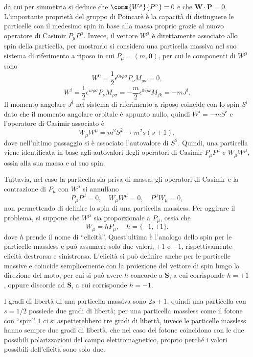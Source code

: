 da cui per simmetria si deduce che $\comm{W^\mu}{P^\nu} = 0$ e che $\bm{W}\cdot\bm{P} = 0$. L'importante proprietà del gruppo di Poincarè è la capacità di distinguere le particelle con il medesimo spin in base alla massa proprio grazie al nuovo operatore di Casimir $P_\mu P^\mu$. Invece, il vettore $W^\mu$ è direttamente associato allo spin della particella, per mostrarlo si considera una particella massiva nel suo sistema di riferimento a riposo in cui $P_\mu = (m,\bm{0})$, per cui le componenti di $W^\mu$ sono
\begin{equation}
    W^0 = \frac{1}{2}\epsilon^{0\nu\rho\sigma}P_\nu M_{\rho\sigma} = 0,
\end{equation}
\begin{equation}
    W^i = \frac{1}{2}\epsilon^{i\nu\rho\sigma}P_\nu M_{\rho\sigma} = -\frac{m}{2}\epsilon^{0ijk}M_{jk}=-mJ^i.
\end{equation}
Il momento angolare $J^i$ nel sistema di riferimento a riposo coincide con lo spin $S^i$ dato che il momento angolare orbitale è appunto nullo, quindi $W^i = -mS^i$ e l'operatore di Casimir associato è 
\begin{equation}
    W_\mu W^\mu = m^2S^2 \rightarrow m^2 s(s+1),
\end{equation}
dove nell'ultimo passaggio si è associato l'autovalore di $S^2$. Quindi, una particella viene identificata in base agli autovalori degli operatori di Casimir $P_\mu P^\mu$ e $W_\mu W^\mu$, ossia alla sua massa e al suo spin.

Tuttavia, nel caso la particella sia priva di massa, gli operatori di Casimir e la contrazione di $P_\mu$ con $W^\mu$ si annullano
\begin{equation}
    P_\mu P^\mu = 0,\quad W_\mu W^\mu = 0,\quad P^\mu W_\mu = 0,
\end{equation}
non permettendo di definire lo spin di una particella massless. Per aggirare il problema, si suppone che $W^\mu$ sia proporzionale a $P_\mu$, ossia che 
\begin{equation}
    W_\mu = h P_\mu,\quad h = \{-1,+1\}.
\end{equation}
dove $h$ prende il nome di ``elicità''. Quest'ultima è l'analogo dello spin per le particelle massless e può assumere solo due valori, $+1$ e $-1$, rispettivamente elicità destrorsa e sinistrorsa. L'elicità si può definire anche per le particelle massive e coincide semplicemente con la proiezione del vettore di spin lungo la direzione del moto, per cui si può avere $h$ concorde a $\bm{S}$, a cui corrisponde $h = +1$, oppure discorde ad $\bm{S}$, a cui corrisponde $h = -1$.

I gradi di libertà di una particella massiva sono $2s + 1$, quindi una particella con $s = 1/2$ possiede due gradi di libertà; per una particella massless come il fotone con  ``spin'' $1$ ci si aspetterebbero tre gradi di libertà, invece le particelle massless hanno sempre due gradi di libertà, che nel caso del fotone coincidono con le due possibili polarizzazioni del campo elettromagnetico, proprio perché i valori possibili dell'elicità sono solo due.

